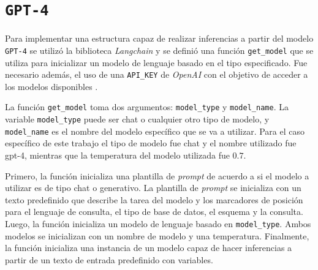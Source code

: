 \section{\texttt{GPT-4}}

Para implementar una estructura capaz de realizar inferencias a partir del modelo \texttt{GPT-4} se utilizó la biblioteca \textit{Langchain} y se definió una función \texttt{get\_model} que se utiliza para inicializar un modelo de lenguaje basado en el tipo especificado. Fue necesario además, el uso de una \texttt{API\_KEY} de \textit{OpenAI} con el objetivo de acceder a los modelos disponibles \cite{openaiapikey}.

La función \texttt{get\_model} toma dos argumentos: \texttt{model\_type} y \texttt{model\_name}. La variable \texttt{model\_type} puede ser chat o cualquier otro tipo de modelo, y \texttt{model\_name} es el nombre del modelo específico que se va a utilizar. Para el caso específico de este trabajo el tipo de modelo fue chat y el nombre utilizado fue gpt-4, mientras que la temperatura del modelo utilizada fue $0.7$.

Primero, la función inicializa una plantilla de \textit{prompt} de acuerdo a si el modelo a utilizar es de tipo chat o generativo. La plantilla de \textit{prompt} se inicializa con un texto predefinido que describe la tarea del modelo y los marcadores de posición para el lenguaje de consulta, el tipo de base de datos, el esquema y la consulta. Luego, la función inicializa un modelo de lenguaje basado en \texttt{model\_type}. Ambos modelos se inicializan con un nombre de modelo y una temperatura. Finalmente, la función inicializa una instancia de un modelo capaz de hacer inferencias a partir de un texto de entrada predefinido con variables.

